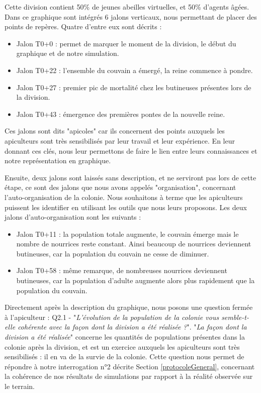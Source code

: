 		Cette division contient 50\% de jeunes abeilles virtuelles, et 50\% d'agents âgées. Dans ce graphique sont intégrés 6 jalons verticaux, nous permettant de placer des points de repères. Quatre d'entre eux sont décrits :
		\begin{itemize}
			\item Jalon T0+0 : permet de marquer le moment de la division, le début du graphique et de notre simulation.
			\item Jalon T0+22 : l'ensemble du couvain a émergé, la reine commence à pondre.
			\item Jalon T0+27 : premier pic de mortalité chez les butineuses présentes lors de la division.
			\item Jalon T0+43 : émergence des premières pontes de la nouvelle reine.
		\end{itemize}
		Ces jalons sont dits "apicoles" car ils concernent des points auxquels les apiculteurs sont très sensibilisés par leur travail et leur expérience. En leur donnant ces clés, nous leur permettons de faire le lien entre leurs connaissances et notre représentation en graphique.
		
		Ensuite, deux jalons sont laissés sans description, et ne serviront pas lors de cette étape, ce sont des jalons que nous avons appelés "organisation", concernant l'auto-organisation de la colonie. Nous souhaitons à terme que les apiculteurs puissent les identifier en utilisant les outils que nous leurs proposons. Les deux jalons d'auto-organisation sont les suivants :
		\begin{itemize}
			\item Jalon T0+11 : la population totale augmente, le couvain émerge mais le nombre de nourrices reste constant. Ainsi beaucoup de nourrices deviennent butineuses, car la population du couvain ne cesse de diminuer.
			\item Jalon T0+58 : même remarque, de nombreuses nourrices deviennent butineuses, car la population d'adulte augmente alors plus rapidement que la population du couvain.
		\end{itemize}
		
		Directement après la description du graphique, nous posons une question fermée à l'apiculteur : Q2.1 - "\textit{L'évolution de la population de la colonie vous semble-t-elle cohérente avec la façon dont la division a été réalisée ?}". "\textit{La façon dont la division a été réalisée}" concerne les quantités de populations présentes dans la colonie après la division, et est un exercice auxquels les apiculteurs sont très sensibilisés : il en va de la survie de la colonie. Cette question nous permet de répondre à notre interrogation n°2 décrite Section \ref{protocoleGeneral}, concernant la cohérence de nos résultats de simulations par rapport à la réalité observée sur le terrain.
		
